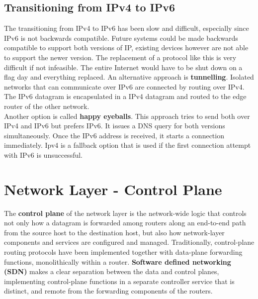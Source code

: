 \subsection{Transitioning from IPv4 to IPv6}
The transitioning from IPv4 to IPv6 has been slow and difficult, especially since IPv6 is not backwards compatible. Future systems could be made backwards compatible to support both versions of IP, existing devices however are not able to support the newer version. The replacement of a protocol like this is very difficult if not infeasible. The entire Internet would have to be shut down on a flag day and everything replaced. An alternative approach is \textbf{tunnelling}. Isolated networks that can communicate over IPv6 are connected by routing over IPv4. The IPv6 datagram is encapsulated in a IPv4 datagram and routed to the edge router of the other network.\\
Another option is called \textbf{happy eyeballs}. This approach tries to send both over IPv4 and IPv6 but prefers IPv6. It issues a DNS query for both versions simultaneously. Once the IPv6 address is received, it starts a connection immediately. Ipv4 is a fallback option that is used if the first connection attempt with IPv6 is unsuccessful.


\section{Network Layer - Control Plane}
The \textbf{control plane} of the network layer is the network-wide logic that controls not only how a datagram is forwarded among routers along an end-to-end path from the source host to the destination host, but also how network-layer components and services are configured and managed. Traditionally, control-plane routing protocols have been implemented together with data-plane forwarding functions, monolithically within a router. \textbf{Software defined networking (SDN)} makes a clear separation between the data and control planes, implementing control-plane functions in a separate controller service that is distinct, and remote from the forwarding components of the routers.

